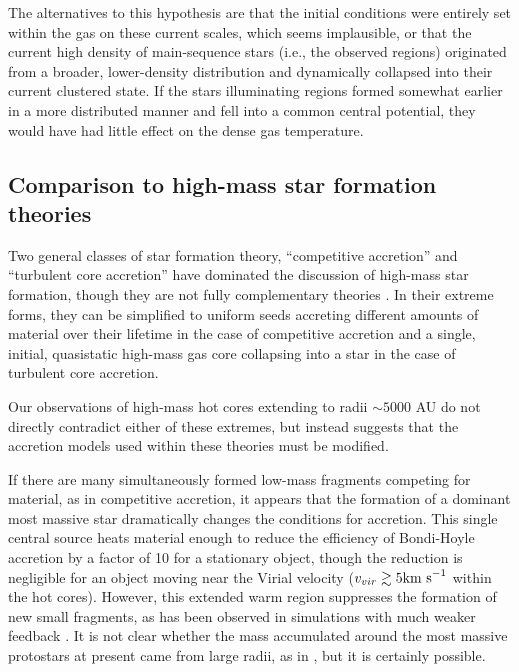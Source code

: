 \documentclass{emulateapj}
\begin{document}
The alternatives to this hypothesis are that the initial conditions were
entirely set within the gas on these current scales, which seems implausible,
or that the current high density of main-sequence stars (i.e., the observed
\hchii regions) originated from a broader, lower-density distribution and
dynamically collapsed into their current clustered state.  If the
stars illuminating \hchii regions formed somewhat earlier in a more distributed
manner and fell into a common central potential, they would have had little
effect on the dense gas temperature.

\subsection{Comparison to high-mass star formation theories}
Two general classes of star formation theory, ``competitive accretion'' and
``turbulent core accretion'' have dominated the discussion of  high-mass star
formation, though they are
not fully complementary theories \citep{Schilke2016a}.  In their extreme forms,
they can be simplified to uniform seeds accreting different amounts of material
over their lifetime in the case of competitive accretion and a single, initial,
quasistatic high-mass gas core collapsing into a star in the case of turbulent
core accretion.

Our observations of high-mass hot cores extending to radii $\sim5000$ AU do
not directly contradict either of these extremes, but instead suggests
that the accretion models used within these theories must be modified.

If there are many simultaneously formed low-mass fragments competing for
material, as in competitive accretion, it appears that the formation of a
dominant most massive star dramatically changes the conditions for accretion.
This single central source heats material enough to reduce the efficiency of
Bondi-Hoyle accretion by a factor of 10 for a stationary object, though the
reduction is negligible for an object moving near the Virial velocity ($v_{vir}
\gtrsim 5 \textrm{km~s}^{-1}$ within the hot cores).  However, this extended warm region
suppresses the formation of new small fragments, as has been observed in simulations
with much weaker feedback \citep[e.g.][]{Bate2009a}. 
It is not clear whether the mass accumulated around the most massive protostars
at present came from large radii, as in \citet{Smith2009f}, but it is certainly
possible.
\end{document}
